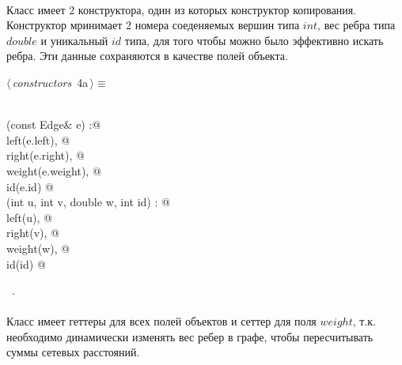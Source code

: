 \documentclass[12pt]{article}
\begin{document}
\paragraph{}
Класс имеет 2 конструктора, один из которых конструктор копирования.
Конструктор мринимает 2 номера соеденяемых вершин типа $int$, 
вес ребра типа $double$ и уникальный $id$ типа, для того чтобы 
можно было эффективно искать ребра. Эти данные сохраняются в качестве
полей объекта. 

\begin{flushleft} \small
\begin{minipage}{\linewidth}\label{scrap2}\raggedright\small
{} $\langle\,${\itshape constructors}\nobreak\ {\footnotesize {4a}}$\,\rangle\equiv$
\vspace{-1ex}
\begin{list}{}{} \item
\mbox{}\verb@@\\
\mbox{}\verb@Edge(const Edge& e) :@\\
\mbox{}\verb@    left(e.left), @\\
\mbox{}\verb@    right(e.right), @\\
\mbox{}\verb@    weight(e.weight), @\\
\mbox{}\verb@    id(e.id) { }@\\
\mbox{}\verb@Edge(int u, int v, double w, int id) : @\\
\mbox{}\verb@    left(u), @\\
\mbox{}\verb@    right(v), @\\
\mbox{}\verb@    weight(w), @\\
\mbox{}\verb@    id(id) { }@\\
\mbox{}\verb@@{\NWsep}
\end{list}
\vspace{-1.5ex}
\footnotesize
\begin{list}{}{\setlength{\itemsep}{-\parsep}\setlength{\itemindent}{-\leftmargin}}
\item \NWtxtMacroRefIn\ .

\item{}
\end{list}
\end{minipage}\vspace{4ex}
\end{flushleft}
\paragraph{}
Класс имеет геттеры для всех полей объектов и сеттер для поля $weight$, т.к.
необходимо динамически изменять вес ребер в графе, чтобы пересчитывать суммы сетевых расстояний.
\end{document}
